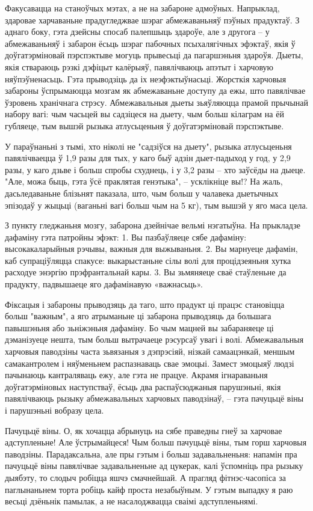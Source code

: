 Факусавацца на станоўчых мэтах, а не на забароне адмоўных. Напрыклад, здаровае харчаваньне прадугледжвае шэраг абмежаваньняў пэўных прадуктаў. З аднаго боку, гэта дзейсны спосаб палепшыць здароўе, але з другога – у абмежаваньняў і забарон ёсьць шэраг пабочных псыхалягічных эфэктаў, якія ў доўгатэрміновай пэрспэктыве могуць прывесьці да пагаршэньня здароўя. Дыеты, якія ствараюць рэзкі дэфіцыт калёрыяў, павялічваюць апэтыт і харчовую няўпэўненасьць. Гэта прыводзіць да іх неэфэктыўнасьці. Жорсткія харчовыя забароны ўспрымаюцца мозгам як абмежаваньне доступу да ежы, што павялічвае ўзровень хранічнага стрэсу. Абмежавальныя дыеты зьяўляюцца прамой прычынай набору вагі: чым часьцей вы садзіцеся на дыету, чым больш кілаграм на ёй губляеце, тым вышэй рызыка атлусьценьня ў доўгатэрміновай пэрспэктыве.

У параўнаньні з тымі, хто ніколі не "садзіўся на дыету", рызыка атлусьценьня павялічваецца ў 1,9 разы для тых, у каго быў адзін дыет-падыход у год, у 2,9 разы, у каго дзьве і больш спробы схуднець, і у 3,2 разы – хто заўсёды на дыеце. "Але, можа быць, гэта ўсё праклятая генэтыка", – усклікніце вы!? На жаль, дасьледаваньне блізьнят паказала, што, чым больш у чалавека дыетычных эпізодаў у жыцьці (ваганьні вагі больш чым на 5 кг), тым вышэй у яго маса цела.

З пункту гледжаньня мозгу, забарона дзейнічае вельмі нэгатыўна. На прыкладзе дафаміну гэта патройны эфэкт: 1. Вы пазбаўляеце сябе дафаміну: высокакаларыйныя рэчывы, важныя для выжываньня. 2. Вы марнуеце дафамін, каб супраціўляцца спакусе: выкарыстаньне сілы волі для процідзеяньня хутка расходуе энэргію прэфрантальнай кары. 3. Вы зьмяняеце сваё стаўленьне да прадукту, падвышаеце яго дафамінавую «важнасьць».

Фіксацыя і забароны прыводзяць да таго, што прадукт ці працэс становіцца больш "важным", а яго атрыманьне ці забарона прыводзяць да большага павышэньня або зьніжэньня дафаміну. Бо чым мацней вы забараняеце ці дэманізуеце нешта, тым больш вытрачаеце рэсурсаў увагі і волі. Абмежавальныя харчовыя паводзіны часта зьвязаныя з дэпрэсіяй, нізкай самаацэнкай, меншым самакантролем і няўменьнем распазнаваць свае эмоцыі. Замест эмоцыяў людзі пачынаюць кантраляваць ежу, але гэта не працуе. Акрамя ігнараваньня доўгатэрміновых наступстваў, ёсьць два распаўсюджаныя парушэньні, якія павялічваюць рызыку абмежавальных харчовых паводзінаў, – гэта пачуцьцё віны і парушэньні вобразу цела.

Пачуцьцё віны. О, як хочацца абрынуць на сябе праведны гнеў за харчовае адступленьне! Але ўстрымайцеся! Чым больш пачуцьцё віны, тым горш харчовыя паводзіны. Парадаксальна, але пры гэтым і больш задавальненьня: напамін пра пачуцьцё віны павялічвае задавальненьне ад цукерак, калі ўспомніць пра рызыку дыябэту, то слодыч робіцца яшчэ смачнейшай. А прагляд фітнэс-часопіса за паглынаньнем торта робіць кайф проста незабыўным. У гэтым выпадку я раю весьці дзёньнік памылак, а не насалоджвацца сваімі адступленьнямі.

